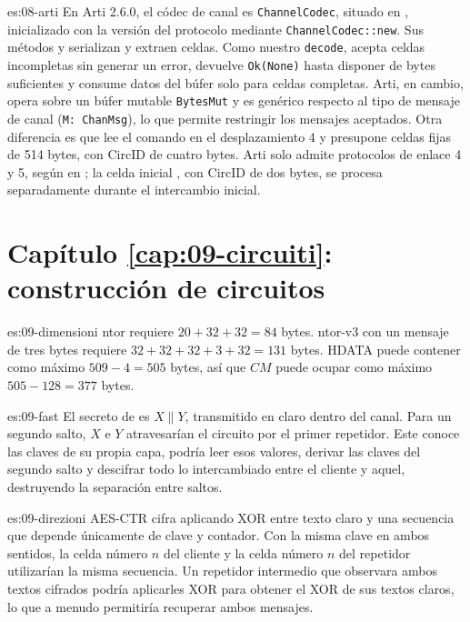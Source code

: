 \begin{soluzione}{es:08-arti}
En Arti 2.6.0, el códec de canal es \texttt{ChannelCodec}, situado en , inicializado con la versión del protocolo mediante \texttt{ChannelCodec::new}. Sus métodos  y  serializan y extraen celdas. Como nuestro \texttt{decode},  acepta celdas incompletas sin generar un error, devuelve \texttt{Ok(None)} hasta disponer de bytes suficientes y consume datos del búfer solo para celdas completas. Arti, en cambio, opera sobre un búfer mutable \texttt{BytesMut} y es genérico respecto al tipo de mensaje de canal (\texttt{M: ChanMsg}), lo que permite restringir los mensajes aceptados. Otra diferencia es que  lee el comando en el desplazamiento 4 y presupone celdas fijas de 514 bytes, con CircID de cuatro bytes. Arti solo admite protocolos de enlace 4 y 5, según  en ; la celda inicial , con CircID de dos bytes, se procesa separadamente durante el intercambio inicial.
\end{soluzione}

\section*{Capítulo \ref{cap:09-circuiti}: construcción de circuitos}

\begin{soluzione}{es:09-dimensioni}
ntor requiere $20+32+32=84$ bytes. ntor-v3 con un mensaje de tres bytes requiere $32+32+32+3+32=131$ bytes. HDATA puede contener como máximo $509-4=505$ bytes, así que $CM$ puede ocupar como máximo $505-128=377$ bytes.
\end{soluzione}

\begin{soluzione}{es:09-fast}
El secreto de  es $X\|Y$, transmitido en claro dentro del canal. Para un segundo salto, $X$ e $Y$ atravesarían el circuito por el primer repetidor. Este conoce las claves de su propia capa, podría leer esos valores, derivar las claves del segundo salto y descifrar todo lo intercambiado entre el cliente y aquel, destruyendo la separación entre saltos.
\end{soluzione}

\begin{soluzione}{es:09-direzioni}
AES-CTR cifra aplicando XOR entre texto claro y una secuencia que depende únicamente de clave y contador. Con la misma clave en ambos sentidos, la celda número $n$ del cliente y la celda número $n$ del repetidor utilizarían la misma secuencia. Un repetidor intermedio que observara ambos textos cifrados podría aplicarles XOR para obtener el XOR de sus textos claros, lo que a menudo permitiría recuperar ambos mensajes.
\end{soluzione}

